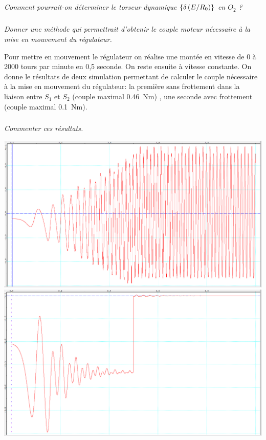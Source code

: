 \documentclass[10pt,fleqn]{article} %
\begin{document}
\begin{multicols}{2}
\begin{corrige}
\end{corrige}
\else
\fi

\subparagraph{}\textit{Comment pourrait-on déterminer le torseur dynamique  $\left\{\delta \left(E/R_0 \right) \right\}$ en $O_2$ ?}

\subparagraph{}\textit{Donner une méthode qui permettrait d'obtenir le couple moteur nécessaire à la mise en mouvement du régulateur.}

Pour mettre en mouvement le régulateur on réalise une montée en vitesse de 0 à 2000 tours par minute en 0,5 seconde.  On reste ensuite à vitesse constante. On donne le résultats de deux simulation permettant de calculer le couple nécessaire à la mise en mouvement du régulateur: la première sans frottement dans la liaison entre $S_1$ et $S_2$ (couple maximal \SI{0,46}{Nm}) , une seconde avec frottement (couple maximal \SI{0,1}{Nm}). 

\subparagraph{}\textit{Commenter ces résultats. }



\ifprof
\else
\end{multicols}
\fi

\begin{center}
\includegraphics[width=.48\linewidth]{images/Cm_SansFrottement.png}
\includegraphics[width=.48\linewidth]{images/Cm_Frottement.png}
\end{center}


\end{document}
